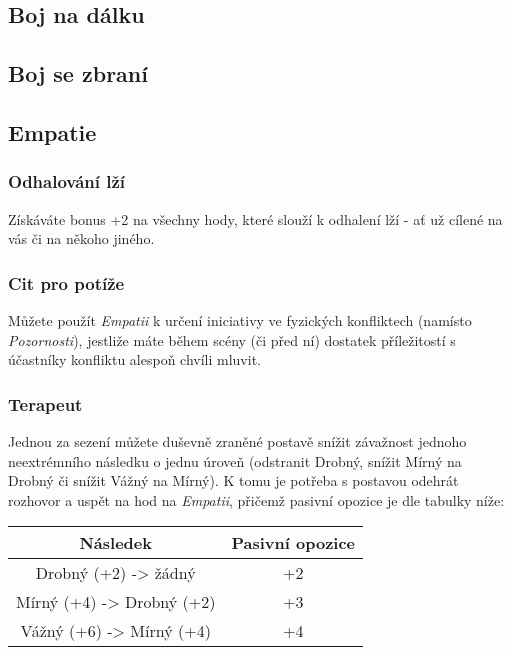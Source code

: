 \subsection{Boj na dálku}
\label{sec:trik-bnd}

\subsection{Boj se zbraní}
\label{sec:trik-bsz}

\subsection{Empatie}
\label{sec:trik-empatie}

\subsubsection{Odhalování lží}
\label{sec:empatie-odhalovani}
Získáváte bonus +2 na všechny hody, které slouží k odhalení lží - ať už cílené na vás či na někoho jiného.

\subsubsection{Cit pro potíže}
\label{sec:empatie-cit}
Můžete použít \textit{Empatii} k určení iniciativy ve fyzických konfliktech (namísto \textit{Pozornosti}), jestliže máte během scény (či před ní) dostatek příležitostí s účastníky konfliktu alespoň chvíli mluvit.

\subsubsection{Terapeut}
\label{sec:empatie-terapuet}
Jednou za sezení můžete duševně zraněné postavě snížit závažnost jednoho neextrémního následku o jednu úroveň (odstranit Drobný, snížit Mírný na Drobný či snížit Vážný na Mírný). K tomu je potřeba s postavou odehrát rozhovor a uspět na hod na \textit{Empatii}, přičemž pasivní opozice je dle tabulky níže:

\begin{table}  
\centering
\begin{tabular}[h]{c|c}
Následek & Pasivní opozice \\ \hline
Drobný (+2) -> žádný & +2 \\
Mírný (+4) -> Drobný (+2) & +3 \\
Vážný (+6) -> Mírný (+4) & +4\\
\end{tabular}
\end{table}


